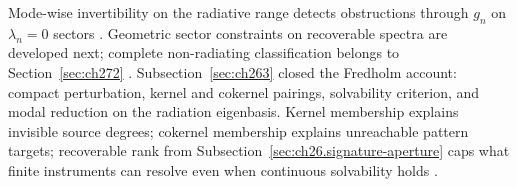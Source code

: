 Mode-wise invertibility on the radiative range detects obstructions through $g_n$ on
$\lambda_n=0$ sectors \cite{stratton1941}. Geometric sector constraints on recoverable spectra
are developed next; complete non-radiating classification belongs to Section~\ref{sec:ch272}
\cite{stratton1941}.
\medskip
\noindent
Subsection~\ref{sec:ch263} closed the Fredholm account: compact perturbation, kernel and
cokernel pairings, solvability criterion, and modal reduction on the radiation eigenbasis.
Kernel membership explains invisible source degrees; cokernel membership explains unreachable
pattern targets; recoverable rank from Subsection~\ref{sec:ch26.signature-aperture} caps what
finite instruments can resolve even when continuous solvability holds \cite{stratton1941}.
